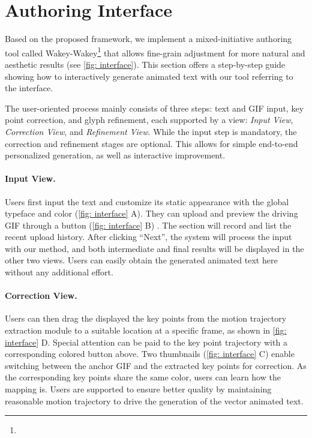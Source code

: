 

\section{Authoring Interface}
\label{sec:authoring_tool}
Based on the proposed framework, we implement a mixed-initiative authoring tool called Wakey-Wakey\footnote{} that allows fine-grain adjustment for more natural and aesthetic results (see \autoref{fig: interface}).
This section offers a step-by-step guide showing how to interactively generate animated text with our tool referring to the interface.





The user-oriented process mainly consists of three steps: text and GIF input, key point correction, and glyph refinement, each supported by a view: \textit{Input View}, \textit{Correction View}, and \textit{Refinement View}.
While the input step is mandatory, the correction and refinement stages are optional. This allows for simple end-to-end personalized generation, as well as interactive improvement.

\paragraph{Input View.}
Users first input the text and customize its static appearance with the global typeface and color (\autoref{fig: interface} A).
They can upload and preview the driving GIF through a button (\autoref{fig: interface} B) .
The section will record and list the recent upload history. 
After clicking ``Next'', the system will process the input with our method, and both intermediate and final results will be displayed in the other two views. Users can easily obtain the generated animated text here without any additional effort.

\paragraph{Correction View.}
Users can then drag the displayed the key points from the motion trajectory extraction module to a suitable location at a specific frame, as shown in \autoref{fig: interface} D.
Special attention can be paid to the key point trajectory with a corresponding colored button above. 
Two thumbnails (\autoref{fig: interface} C) enable switching between the anchor GIF and the extracted key points for correction.
As the corresponding key points share the same color, users can learn how the mapping is.
Users are supported to ensure better quality by maintaining reasonable motion trajectory to drive the generation of the vector animated text.


